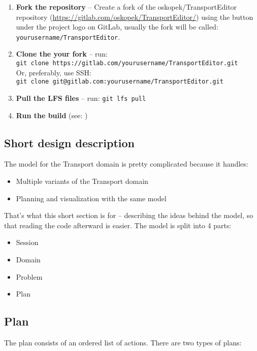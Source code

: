 \begin{enumerate}
\begin{itemize}
\end{itemize}

\item \textbf{Fork the repository} -- Create a fork of the oskopek/TransportEditor repository (\url{https://gitlab.com/oskopek/TransportEditor/}) using the button under the project logo on GitLab, usually the fork will be called: \texttt{yourusername/TransportEditor}.

\item \textbf{Clone the your fork} -- run:\\ \texttt{git clone https://gitlab.com/yourusername/TransportEditor.git}\\
Or, preferably, use SSH:\\ \texttt{git clone git@gitlab.com:yourusername/TransportEditor.git}

\item \textbf{Pull the LFS files} -- run: \texttt{git lfs pull}

\item \textbf{Run the build} (see: )
\end{enumerate}

\subsection*{Short design description}
The model for the Transport domain is pretty complicated
because it handles:

\begin{itemize}
\item Multiple variants of the Transport domain

\item Planning and visualization with the same model
\end{itemize}

That's what this short section is for -- describing the ideas behind the model, so that reading the code
afterward is easier. The model is split into 4 parts:

\begin{itemize}
\item Session
\item Domain
\item Problem
\item Plan
\end{itemize}

\subsection*{Plan}
The plan consists of an ordered list of actions.
There are two types of plans:

